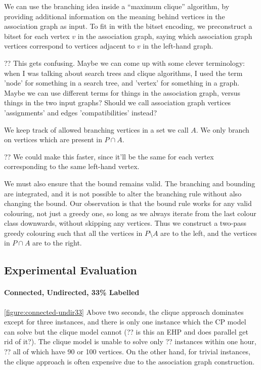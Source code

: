 \documentclass{llncs}
\begin{document}
We can use the branching idea inside a ``maximum clique'' algorithm, by providing additional
information on the meaning behind vertices in the association graph as input. To fit in with the
bitset encoding, we preconstruct a bitset for each vertex $v$ in the association graph, saying which
association graph vertices correspond to vertices adjacent to $v$ in the left-hand graph.

?? This gets confusing. Maybe we can come up with some clever terminology: when I was talking about
search trees and clique algorithms, I used the term 'node' for something in a search tree, and
'vertex' for something in a graph. Maybe we can use different terms for things in the association
graph, versus things in the two input graphs? Should we call association graph vertices
'assignments' and edges 'compatibilities' instead?

We keep track of allowed branching vertices in a set we call $A$. We only branch on vertices which
are present in $P \cap A$.

?? We could make this faster, since it'll be the same for each vertex corresponding to the same
left-hand vertex.

We must also ensure that the bound remains valid. The branching and bounding are integrated, and it
is not possible to alter the branching rule without also changing the bound. Our observation is that
the bound rule works for any valid colouring, not just a greedy one, so long as we always iterate
from the last colour class downwards, without skipping any vertices. Thus we construct a two-pass
greedy colouring such that all the vertices in $P \setminus A$ are to the left, and the vertices in
$P \cap A$ are to the right.

\cite{DBLP:conf/cp/McCreeshP14}

\subsection{Experimental Evaluation}

\paragraph{Connected, Undirected, 33\% Labelled} \cref{figure:connected-undir33} Above two seconds,
    the clique approach dominates except for three instances, and there is only one instance which
    the CP model can solve but the clique model cannot (?? is this an EHP and does parallel get rid
    of it?). The clique model is unable to solve only ??  instances within one hour, ?? all of which
    have 90 or 100 vertices.  On the other hand, for trivial instances, the clique approach is often
    expensive due to the association graph construction.
\end{document}
